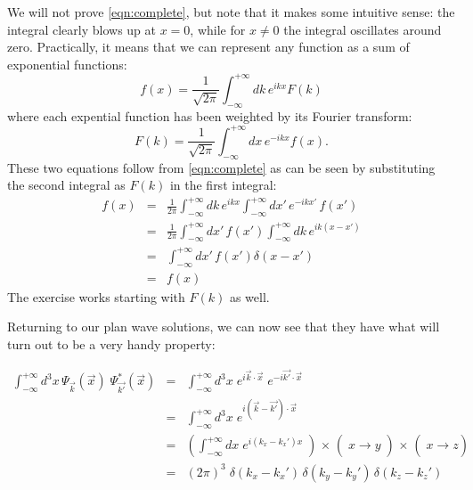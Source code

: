 \documentclass[12pt]{article}
\begin{document}
We will not prove \eqref{eqn:complete}, but note that it makes some intuitive
sense: the integral clearly blows up at $x=0$, while for $x \ne 0$ the integral
oscillates around zero.  Practically, it means that we can represent any
function as a sum of exponential functions:
\begin{displaymath}
f(x) = \frac{1}{\sqrt{2\pi}} \int_{-\infty}^{+\infty} dk \, e^{\textstyle ikx} F(k) 
\end{displaymath}
where each expential function has been weighted by its Fourier transform:
\begin{displaymath}
F(k) = \frac{1}{\sqrt{2\pi}} \int_{-\infty}^{+\infty} dx \, e^{\textstyle -ikx} f(x). 
\end{displaymath}
These two equations follow from \eqref{eqn:complete} as can be seen by substituting the second integral as $F(k)$ in the first integral:
\begin{eqnarray*}
f(x) &=&
\frac{1}{2\pi} \int_{-\infty}^{+\infty} dk \, e^{\textstyle ikx} 
\int_{-\infty}^{+\infty} dx' \, e^{\textstyle -ikx'} \, f(x') \\
&=&
\frac{1}{2\pi} \int_{-\infty}^{+\infty} dx' \, f(x') 
\int_{-\infty}^{+\infty} dk \, e^{\textstyle ik(x-x')} \\ 
&=&
\int_{-\infty}^{+\infty} dx' \, f(x') 
\delta(x-x')\\
&=& f(x)
\end{eqnarray*}
The exercise works starting with $F(k)$ as well.

Returning to our plan wave solutions, we can now see that they have what will
turn out to be a very handy property:

\begin{eqnarray*}
\int^{+\infty}_{-\infty} d^3x 
\, \Psi_{\vec{k}}(\vec{x}) 
\; \Psi^*_{\vec{k'}}(\vec{x}) 
&=&
\int^{+\infty}_{-\infty} d^3x 
\; e^{\textstyle i\vec{k}\cdot\vec{x}}
\; e^{\textstyle -i\vec{k'}\cdot\vec{x}}\\
&=&
\int^{+\infty}_{-\infty} d^3x 
\; e^{\textstyle i(\vec{k}-\vec{k'})\cdot\vec{x}}\\
&=&
\left(\int^{+\infty}_{-\infty} dx 
\; e^{\textstyle i(k_x-k_x')x}
\middle)
\times \middle( x \to y \middle) \times \middle( x \to z \right)\\
&=& (2 \pi)^3 \; \delta(k_x-k_x')\,\delta(k_y-k_y')\,\delta(k_z-k_z')\\
\end{eqnarray*}
\end{document}
